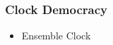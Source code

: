 \begin{frame}
\frametitle{Clock Democracy}
\begin{itemize}
  \item Ensemble Clock
\end{itemize} 
\end{frame}
